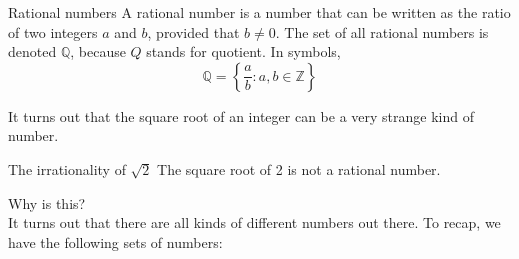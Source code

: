 \documentclass[12pt,fleqn]{book}
\begin{document}
\begin{defn}{Rational numbers}{}
    A rational number is a number that can be written as the ratio of two integers $a$ and $b$, provided that $b\ne 0$.  The set of all rational numbers is denoted $\mathbb Q$, because $Q$ stands for quotient.  In symbols,
    \[
        \mathbb Q = \left\{ \frac ab : a, b \in \mathbb Z \right\}
    \]
\end{defn}
It turns out that the square root of an integer can be a very strange kind of number.
\begin{thm}{The irrationality of $\sqrt 2$}{}
    The square root of 2 is not a rational number.
\end{thm}
Why is this?
\\[4in]
\clearpage
It turns out that there are all kinds of different numbers out there.
To recap, we have the following sets of numbers:
\end{document}
